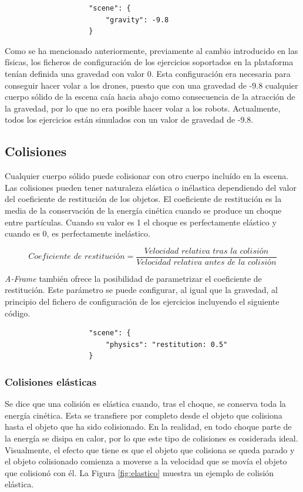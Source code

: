 \begin{verbatim}
                    "scene": {
                        "gravity": -9.8
                    }
\end{verbatim}

Como se ha mencionado anteriormente, previamente al cambio introducido en las físicas, los ficheros de configuración de los ejercicios soportados en la plataforma tenían definida una gravedad con valor 0. Esta configuración era necesaria para conseguir hacer volar a los drones, puesto que con una gravedad de -9.8 cualquier cuerpo sólido de la escena caía hacia abajo como consecuencia de la atracción de la gravedad, por lo que no era posible hacer volar a los robots. Actualmente, todos los ejercicios están simulados con un valor de gravedad de -9.8.  \newline

\subsection{Colisiones}
Cualquier cuerpo sólido puede colisionar con otro cuerpo incluído en la escena. Las colisiones pueden tener naturaleza elástica o inélastica dependiendo del valor del coeficiente de restitución de los objetos. El coeficiente de restitución es la media de la conservación de la energía cinética cuando se produce un choque entre partículas. Cuando su valor es 1 el choque es perfectamente elástico y cuando es 0, es perfectamente inelástico. 

\begin{equation}
   Coeficiente \,\, de \,\,restitución = \frac{Velocidad \,\, relativa \,\, tras \,\, la \,\, colisión}{Velocidad \,\, relativa \,\, antes \,\, de \,\, la \,\, colisión}
\end{equation} \newline

\textit{A-Frame} también ofrece la posibilidad de parametrizar el coeficiente de restitución. Este parámetro se puede configurar, al igual que la gravedad, al principio del fichero de configuración de los ejercicios incluyendo el siguiente código.

\begin{verbatim}
                    "scene": {
                        "physics": "restitution: 0.5"
                    }
\end{verbatim}

\subsubsection{Colisiones elásticas}
Se dice que una colisión es elástica cuando, tras el choque, se conserva toda la energía cinética. Esta se transfiere por completo desde el objeto que colisiona hasta el objeto que ha sido colisionado. En la realidad, en todo choque parte de la energía se disipa en calor, por lo que este tipo de colisiones es cosiderada ideal. Visualmente, el efecto que tiene es que el objeto que colisiona se queda parado y el objeto colisionado comienza a moverse a la velocidad que se movía el objeto que colisionó con él. La Figura \ref{fig:elastico} muestra un ejemplo de colisión elástica.


